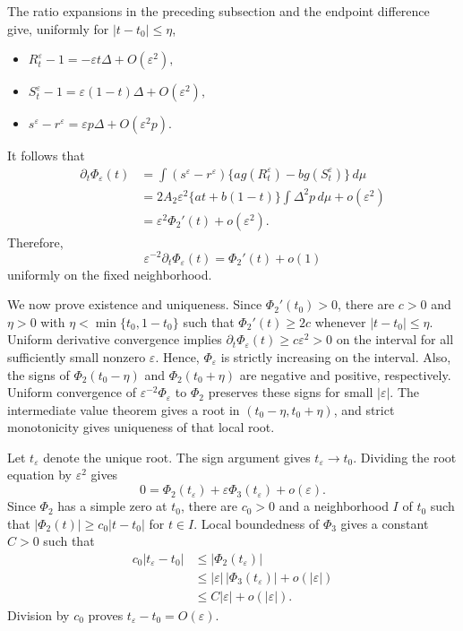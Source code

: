 \documentclass[11pt]{article}
\theoremstyle{plain}
\theoremstyle{definition}
\theoremstyle{definition}
\newcommand{\eps}{\varepsilon}
\begin{document}
The ratio expansions in the preceding subsection and the endpoint difference give, uniformly for $|t-t_0|\le\eta$,
\begin{itemize}[label=\textendash]
    \item $R_t^\eps-1=-\eps t\Delta+O(\eps^2),$
\item $S_t^\eps-1=\eps(1-t)\Delta+O(\eps^2),$
\item $s^\eps-r^\eps=\eps p\Delta+O(\eps^2p).$
\end{itemize}


It follows that
\[
\begin{aligned}
\partial_t\Phi_\eps(t)
&=\int (s^\eps-r^\eps)
   \{a g(R_t^\eps)-b g(S_t^\eps)\}\,d\mu\\
&=2A_2\eps^2\{at+b(1-t)\}
  \int\Delta^2p\,d\mu+o(\eps^2)\\
&=\eps^2\Phi_2'(t)+o(\eps^2).
\end{aligned}
\]
Therefore,
\[
\eps^{-2}\partial_t\Phi_\eps(t)=\Phi_2'(t)+o(1)
\]
uniformly on the fixed neighborhood.


We now prove existence and uniqueness. Since $\Phi_2'(t_0)>0$, there are $c>0$ and $\eta>0$ with $\eta<\min\{t_0,1-t_0\}$ such that $\Phi_2'(t)\ge2c$ whenever $|t-t_0|\le\eta$. Uniform derivative convergence implies $\partial_t\Phi_\eps(t)\ge c\eps^2>0$ on the interval for all sufficiently small nonzero $\eps$. Hence, $\Phi_\eps$ is strictly increasing on the interval. Also, the signs of $\Phi_2(t_0-\eta)$ and $\Phi_2(t_0+\eta)$ are negative and positive, respectively. Uniform convergence of $\eps^{-2}\Phi_\eps$ to $\Phi_2$ preserves these signs for small $|\eps|$. The intermediate value theorem gives a root in $(t_0-\eta,t_0+\eta)$, and strict monotonicity gives uniqueness of that local root.

Let $t_\eps$ denote the unique root. The sign argument gives $t_\eps\to t_0$. Dividing the root equation by $\eps^2$ gives
\[
0=\Phi_2(t_\eps)+\eps\Phi_3(t_\eps)+o(\eps).
\]
Since $\Phi_2$ has a simple zero at $t_0$, there are $c_0>0$ and a neighborhood $I$ of $t_0$ such that $|\Phi_2(t)|\ge c_0|t-t_0|$ for $t\in I$. 
Local boundedness of $\Phi_3$ gives a constant $C>0$ such that
\[
\begin{aligned}
c_0|t_\eps-t_0|
&\le |\Phi_2(t_\eps)|\\
&\le |\eps|\,|\Phi_3(t_\eps)|+o(|\eps|)\\
&\le C|\eps|+o(|\eps|).
\end{aligned}
\]
Division by $c_0$ proves $t_\eps-t_0=O(\eps)$.
\end{document}
